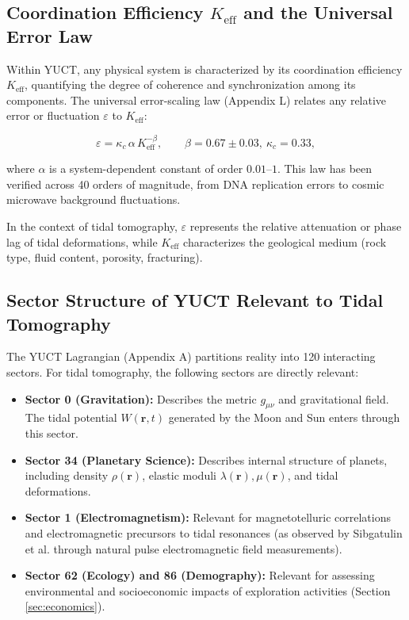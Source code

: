 \documentclass[12pt,a4paper]{article}
\theoremstyle{remark}
\newcommand{\Keff}{K_{\mathrm{eff}}}
\newcommand{\kappac}{\kappa_c}
\newcommand{\eps}{\varepsilon}
\begin{document}
	\subsection{Coordination Efficiency $\Keff$ and the Universal Error Law}
	
	Within YUCT, any physical system is characterized by its coordination efficiency $\Keff$, quantifying the degree of coherence and synchronization among its components. The universal error-scaling law (Appendix L) relates any relative error or fluctuation $\eps$ to $\Keff$:
	
	\begin{equation}
		\eps = \kappac \, \alpha \, \Keff^{-\beta}, \qquad \beta = 0.67 \pm 0.03,\ \kappac = 0.33,
		\label{eq:universal-scaling}
	\end{equation}
	
	where $\alpha$ is a system-dependent constant of order $0.01$–$1$. This law has been verified across 40 orders of magnitude, from DNA replication errors to cosmic microwave background fluctuations.
	
	In the context of tidal tomography, $\eps$ represents the relative attenuation or phase lag of tidal deformations, while $\Keff$ characterizes the geological medium (rock type, fluid content, porosity, fracturing).
	
	\subsection{Sector Structure of YUCT Relevant to Tidal Tomography}
	
	The YUCT Lagrangian (Appendix A) partitions reality into 120 interacting sectors. For tidal tomography, the following sectors are directly relevant:
	
	\begin{itemize}
		\item \textbf{Sector 0 (Gravitation):} Describes the metric $g_{\mu\nu}$ and gravitational field. The tidal potential $W(\mathbf{r},t)$ generated by the Moon and Sun enters through this sector.
		\item \textbf{Sector 34 (Planetary Science):} Describes internal structure of planets, including density $\rho(\mathbf{r})$, elastic moduli $\lambda(\mathbf{r}), \mu(\mathbf{r})$, and tidal deformations.
		\item \textbf{Sector 1 (Electromagnetism):} Relevant for magnetotelluric correlations and electromagnetic precursors to tidal resonances (as observed by Sibgatulin et al. \cite{Sibgatulin2014} through natural pulse electromagnetic field measurements).
		\item \textbf{Sector 62 (Ecology) and 86 (Demography):} Relevant for assessing environmental and socioeconomic impacts of exploration activities (Section \ref{sec:economics}).
	\end{itemize}
	
\end{document}

